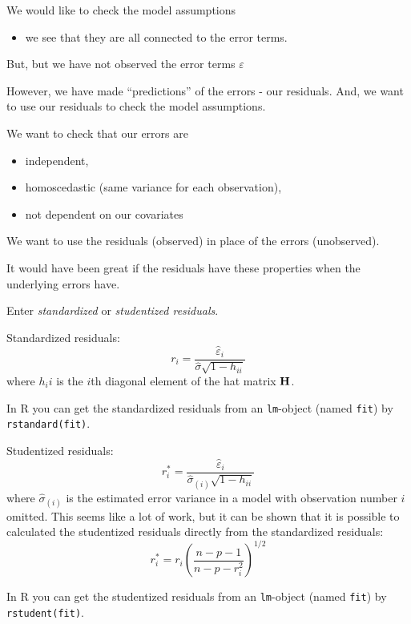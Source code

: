 \documentclass[
  ignorenonframetext,
]{beamer}
\providecommand{\tightlist}{%
  \setlength{\itemsep}{0pt}\setlength{\parskip}{0pt}}
\begin{document}
\begin{frame}
We would like to check the model assumptions

\begin{itemize}
\tightlist
\item
  we see that they are all connected to the error terms.
\end{itemize}

But, but we have not observed the error terms \(\varepsilon\)

However, we have made ``predictions'' of the errors - our residuals.
And, we want to use our residuals to check the model assumptions.
\end{frame}

\begin{frame}
We want to check that our errors are

\begin{itemize}
\tightlist
\item
  independent,
\item
  homoscedastic (same variance for each observation),
\item
  not dependent on our covariates
\end{itemize}

We want to use the residuals (observed) in place of the errors
(unobserved).

It would have been great if the residuals have these properties when the
underlying errors have.

Enter \emph{standardized} or \emph{studentized residuals}.
\end{frame}

\begin{frame}[fragile]
\begin{block}{Standardized residuals:}
\protect{}\label{standardized-residuals}
\[r_i=\frac{\hat{\varepsilon}_i}{\hat{\sigma}\sqrt{1-h_{ii}}}\] where
\(h_ii\) is the \(i\)th diagonal element of the hat matrix \({\bf H}\).

In R you can get the standardized residuals from an \texttt{lm}-object
(named \texttt{fit}) by \texttt{rstandard(fit)}.
\end{block}
\end{frame}

\begin{frame}[fragile]
\begin{block}{Studentized residuals:}
\protect{}\label{studentized-residuals}
\[r^*_i=\frac{\hat{\varepsilon}_i}{\hat{\sigma}_{(i)}\sqrt{1-h_{ii}}}\]
where \(\hat{\sigma}_{(i)}\) is the estimated error variance in a model
with observation number \(i\) omitted. This seems like a lot of work,
but it can be shown that it is possible to calculated the studentized
residuals directly from the standardized residuals:
\[r^*_i=r_i (\frac{n-p-1}{n-p-r_i^2})^{1/2}\]

In R you can get the studentized residuals from an \texttt{lm}-object
(named \texttt{fit}) by \texttt{rstudent(fit)}.
\end{block}
\end{frame}
\end{document}

